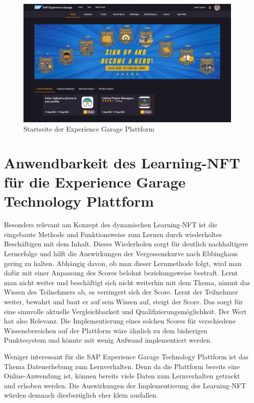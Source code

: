     \begin{figure}
        \includegraphics[width=15.8cm]{Bilder/XGTP.PNG}
        \centering
        \caption{Startseite der Experience Garage Plattform}
        \label{fig:xgtp}
    \end{figure}

\section{Anwendbarkeit des Learning-NFT für die Experience Garage Technology Plattform} \label{testref}

Besonders relevant am Konzept des dynamischen Learning-NFT ist die eingebaute Methode und Funktionsweise zum Lernen durch wiederholtes Beschäftigen mit dem Inhalt.
Dieses Wiederholen sorgt für deutlich nachhaltigere Lernerfolge und hilft die Auswirkungen der Vergessenskurve nach Ebbinghaus gering zu halten.
Abhängig davon, ob man dieser Lernmethode folgt, wird man dafür mit einer Anpassung des Scores belohnt beziehungsweise bestraft.
Lernt man nicht weiter und beschäftigt sich nicht weiterhin mit dem Thema, nimmt das Wissen des Teilnehmers ab, es verringert sich der Score.
Lernt der Teilnehmer weiter, bewahrt und baut er auf sein Wissen auf, steigt der Score.
Das sorgt für eine sinnvolle aktuelle Vergleichbarkeit und Qualifizierungsmöglichkeit. Der Wert hat also Relevanz.
Die Implementierung eines solchen Scores für verschiedene Wissensbereichen auf der Plattform wäre ähnlich zu dem bisherigen Punktesystem und könnte mit wenig Aufwand implementiert werden.

Weniger interessant für die SAP Experience Garage Technology Plattform ist das Thema Datenerhebung zum Lernverhalten.
Denn da die Plattform bereits eine Online-Anwendung ist, können bereits viele Daten zum Lernverhalten getrackt und erhoben werden.
Die Auswirkungen der Implementierung des Learning-NFT würden demnach diesbezüglich eher klein ausfallen.

